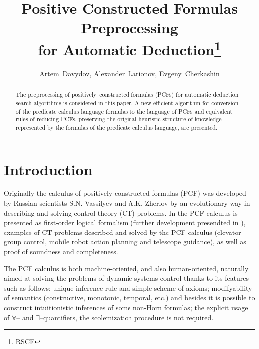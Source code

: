 \documentclass[a4paper,12pt]{article}
\title{Positive Constructed Formulas Preprocessing\\ for Automatic Deduction\thanks{RSCF}}
\author{Artem~Davydov, Alexander~Larionov, Evgeny~Cherkashin}
\date{}
\begin{document}
\maketitle

\begin{abstract}
The preprocessing of positively--constructed formulas (PCFs) for automatic deduction search algorithms is considered in this paper.  A new efficient algorithm for conversion of the predicate calculus language formulas to the language of PCFs and equivalent rules of reducing PCFs, preserving the original heuristic structure of knowledge represented by the formulas of the predicate calculus language, are presented.
\end{abstract}


\newtheorem{definition}{Definition}
\newtheorem{example}{Example}

\newcommand{\fictAquantor}{\ensuremath{\forall\colon\varnothing}}
\newcommand{\fictEquantor}{\ensuremath{\exists\colon\varnothing}}
\newcommand{\bomega}{\boldsymbol{\omega}}
\newcommand{\bphi}{\boldsymbol{\phi}}
\newcommand{\eqdef}{\stackrel{\mathrm{df}}{=}}
\newcommand{\bigand}[2]{\raisebox{-2pt}{\ensuremath{\overset{#1}{\underset{#2}{\text{\Large\&\normalfont}}}}}}



\section{Introduction}

Originally \cite{SNV1990,ICDS2000} the calculus of positively constructed formulas (PCF) was developed by Russian scientists S.N. Vassilyev and A.K. Zherlov by an evolutionary way in describing and solving control theory (CT) problems. In \cite{ICDS2000} the PCF calculus is presented as first-order logical formalism (further development presendted in \cite{jour2} ), examples of CT problems described and solved by the PCF calculus (elevator group control, mobile robot action planning and telescope guidance), as well as proof of soundness and completeness.

The PCF calculus is both machine-oriented, and also human-oriented, naturally aimed at solving the problems of dynamic systems control thanks to its features such as follows: unique inference rule and simple scheme of axioms; modifyability of semantics (constructive, monotonic, temporal, etc.) and besides it is possible to construct intuitionistic inferences of some non-Horn formulas; the explicit usage of $\forall$-- and $\exists$--quantifiers, the scolemization procedure is not required.
\end{document}
